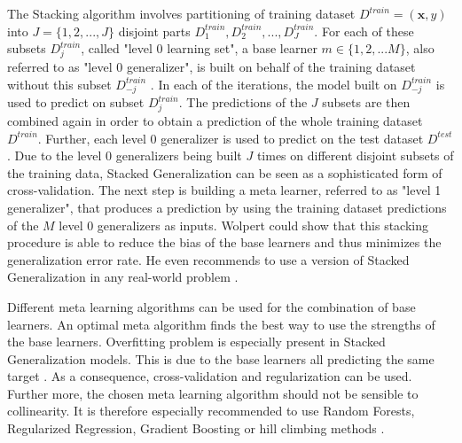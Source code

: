 \documentclass[12pt]{article}
\begin{document}
The Stacking algorithm involves partitioning of training dataset $D^{train} = (\mathbf{x}, y)$ into $J = \{1, 2,..., J\}$ disjoint parts $D^{train}_1, D^{train}_2,..., D^{train}_J$. For each of these subsets $D^{train}_j$, called "level 0 learning set", a base learner $m \in \{1,2,...M\}$, also referred to as "level 0 generalizer", is built on behalf of the training dataset without this subset $D^{train}_{-j}$ \citep[cp.]{wolpert1992stacked}. In each of the iterations, the model built on $D^{train}_{-j}$ is used to predict on subset $D^{train}_j$. The predictions of the $J$ subsets are then combined again in order to obtain a prediction of the whole training dataset $D^{train}$. Further, each level 0 generalizer is used to predict on the test dataset $D^{test}$. Due to the level 0 generalizers being built $J$ times on different disjoint subsets of the training data, Stacked Generalization can be seen as a sophisticated form of cross-validation. The next step is building a meta learner, referred to as "level 1 generalizer", that produces a prediction by using the training dataset predictions of the $M$ level 0 generalizers as inputs. Wolpert could show that this stacking procedure is able to reduce the bias of the base learners and thus minimizes the generalization error rate. He even recommends to use a version of Stacked Generalization in any real-world problem \citep[p.2]{wolpert1992stacked}. 

Different meta learning algorithms can be used for the combination of base learners. An optimal meta algorithm finds the best way to use the strengths of the base learners. Overfitting problem is especially present in Stacked Generalization models. This is due to the base learners all predicting the same target \citep{online2017stacking}. As a consequence, cross-validation and regularization can be used. Further more, the chosen meta learning algorithm should not be sensible to collinearity. It is therefore especially recommended to use Random Forests, Regularized Regression, Gradient Boosting or hill climbing methods \citep{SASpaper}. 
\end{document}
